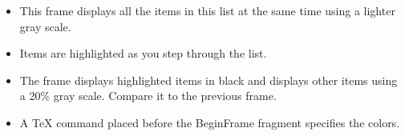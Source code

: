 \documentclass[notes=show,beamer]{beamer}
\makeatletter
\newenvironment{stepitemizewithalert}{\begin{itemize}[<+-| alert@+>]}{\end{itemize} }
\makeatother
\begin{document}
\begin{frame}%



\begin{stepitemizewithalert}
\item This frame displays all the items in this list at the same time using
a lighter gray scale.

\item Items are highlighted as you step through the list.

\item The frame displays highlighted items in black and displays other items
using a 20\% gray scale. Compare it to the previous frame.

\item A TeX command placed before the BeginFrame fragment specifies the
colors.
\end{stepitemizewithalert}

\end{frame}%

\renewenvironment{stepitemizewithalert}{\begin{itemize}[<+-| alert@+>]}{\end{itemize} }%
\end{document}
